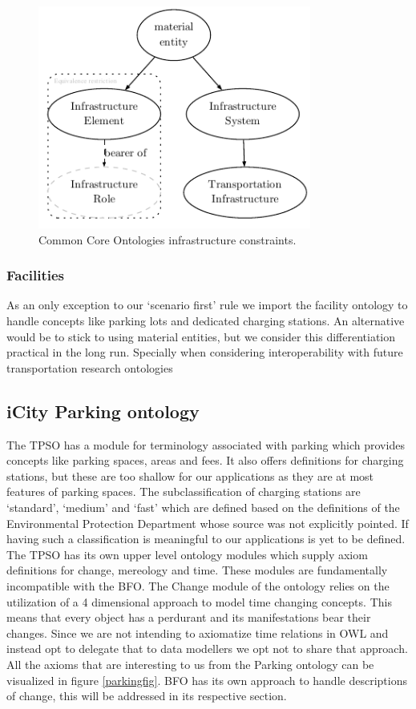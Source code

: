\begin{figure}[h]
    \centering
    \includegraphics[width=0.8\textwidth]{images/infrastructureSystem}
    \caption{Common Core Ontologies infrastructure constraints.}
    \label{infrastructurefigs} 
\end{figure}

\subsubsection{Facilities}

As an only exception to our `scenario first' rule we import the facility
ontology to handle concepts like parking lots and dedicated charging stations.
An alternative would be to stick to using material entities, but we consider
this differentiation practical in the long run. Specially when considering
interoperability with future transportation research ontologies


\subsection{iCity Parking ontology}

The TPSO has a module for terminology associated with parking which provides
concepts like parking spaces, areas and fees. It also offers definitions for
charging stations, but these are too shallow for our applications as they are
at most features of parking spaces. The subclassification of charging stations
are `standard', `medium' and `fast' which are defined based on the definitions
of the Environmental Protection Department whose source was not explicitly
pointed. If having such a classification is meaningful to our applications is
yet to be defined. The TPSO has its own upper level ontology modules which
supply axiom definitions for change, mereology and time. These modules are
fundamentally incompatible with the BFO. The Change module of the ontology
relies on the utilization of a 4 dimensional approach to model time changing
concepts. This means that every object has a perdurant and its manifestations
bear their changes. Since we are not intending to axiomatize time relations in
OWL and instead opt to delegate that to data modellers we opt not to share that
approach. All the axioms that are interesting to us from the Parking ontology
can be visualized in figure \ref{parkingfig}. BFO has its own approach to
handle descriptions of change, this will be addressed in its respective
section.

